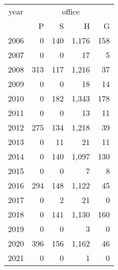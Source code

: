 \footnotesize\begin{tabular}[t]{lrrrr}
\toprule
\multicolumn{1}{c}{year} & \multicolumn{4}{c}{office} \\
\cmidrule(l{3pt}r{3pt}){1-1} \cmidrule(l{3pt}r{3pt}){2-5}
  & P & S & H & G\\
\midrule
2006 & 0 & 140 & 1,176 & 158\\
2007 & 0 & 0 & 17 & 5\\
2008 & 313 & 117 & 1,216 & 37\\
2009 & 0 & 0 & 18 & 14\\
2010 & 0 & 182 & 1,343 & 178\\
2011 & 0 & 0 & 13 & 11\\
2012 & 275 & 134 & 1,218 & 39\\
2013 & 0 & 11 & 21 & 11\\
2014 & 0 & 140 & 1,097 & 130\\
2015 & 0 & 0 & 7 & 8\\
2016 & 294 & 148 & 1,122 & 45\\
2017 & 0 & 2 & 21 & 0\\
2018 & 0 & 141 & 1,130 & 160\\
2019 & 0 & 0 & 3 & 0\\
2020 & 396 & 156 & 1,162 & 46\\
2021 & 0 & 0 & 1 & 0\\
\bottomrule
\end{tabular}
